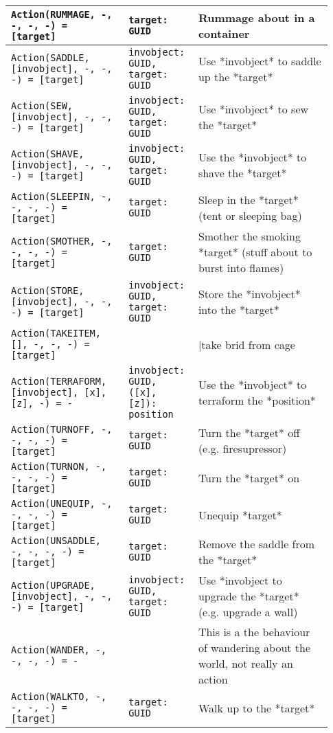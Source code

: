 \begin{table}[htb]
{\begin{longtable}{ | p{0.35\linewidth} | p{0.18\linewidth} | p{0.4\linewidth} | }
		\texttt{Action(RUMMAGE, -, -, -, -) = [target]} & \texttt{{target: GUID}} & Rummage about in a container \\ \hline 
		\texttt{Action(SADDLE, [invobject], -, -, -) = [target]} & \texttt{{invobject: GUID, target: GUID}} &  Use *invobject* to saddle up the *target* \\ \hline 
		\texttt{Action(SEW, [invobject], -, -, -) = [target]} & \texttt{{invobject: GUID}, target: GUID} & Use *invobject* to sew the *target* \\ \hline 
		\texttt{Action(SHAVE, [invobject], -, -, -) = [target]} & \texttt{{invobject: GUID, target: GUID}} & Use the *invobject* to shave the *target* \\ \hline 
		\texttt{Action(SLEEPIN, -, -, -, -) = [target]} & \texttt{{target: GUID}} & Sleep in the *target* (tent or sleeping bag) \\ \hline 
		\texttt{Action(SMOTHER, -, -, -, -) = [target]} & \texttt{{target: GUID}} & Smother the smoking *target* (stuff about to burst into flames) \\ \hline 
		\texttt{Action(STORE, [invobject], -, -, -) = [target]} & \texttt{{invobject: GUID, target: GUID}} & Store the *invobject* into the *target* \\ \hline 
		\texttt{Action(TAKEITEM, [], -, -, -) = [target]} & \texttt{{}} & |take brid from cage \\ \hline 
		\texttt{Action(TERRAFORM, [invobject], [x], [z], -) = -} & \texttt{{invobject: GUID, ([x], [z]): position}} & Use the *invobject* to terraform the *position* \\ \hline 
		\texttt{Action(TURNOFF, -, -, -, -) = [target]} & \texttt{{target: GUID}} & Turn the *target* off (e.g. firesupressor) \\ \hline 
		\texttt{Action(TURNON, -, -, -, -) = [target]} & \texttt{{target: GUID}} & Turn the *target* on \\ \hline 
		\texttt{Action(UNEQUIP, -, -, -, -) = [target]} & \texttt{{target: GUID}} & Unequip *target* \\ \hline 
		\texttt{Action(UNSADDLE, -, -, -, -) = [target]} & \texttt{{target: GUID}} & Remove the saddle from the *target* \\ \hline 
		\texttt{Action(UPGRADE, [invobject], -, -, -) = [target]} & \texttt{{invobject: GUID, target: GUID}} & Use *invobject to upgrade the *target* (e.g. upgrade a wall) \\ \hline 
		\texttt{Action(WANDER, -, -, -, -) = -} & \texttt{{}} & This is a the behaviour of wandering about the world, not really an action \\ \hline 
		\texttt{Action(WALKTO, -, -, -, -) = [target]} & \texttt{{target: GUID}} & Walk up to the *target* \\ \hline 
	\end{longtable}
    }
\end{table}